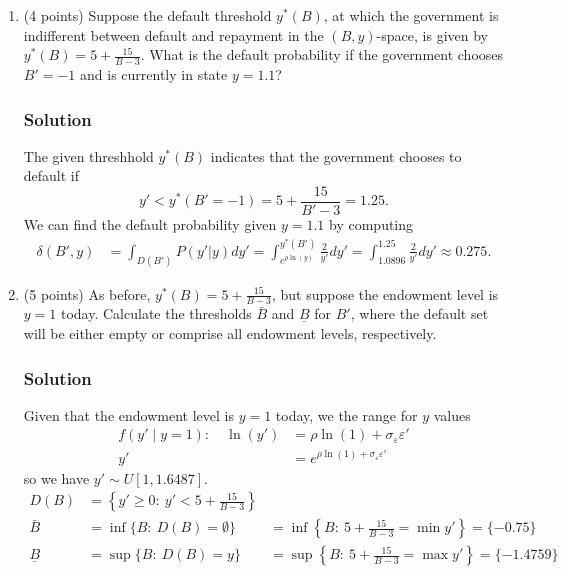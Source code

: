 \documentclass[12pt]{article}
\begin{document}
\begin{enumerate}
\begin{enumerate}
        \item (4 points) Suppose the default threshold $y^*(B)$, at which the government is indifferent between default and repayment in the $(B, y)$-space, is given by $y^*(B) = 5 + \frac{15}{B - 3}$. What is the default probability if the government chooses $B' = -1$ and is currently in state $y = 1.1$?
        \subsubsection*{Solution}

        The given threshhold $y^*(B)$ indicates that the government chooses to default if 
        \[ y' < y^*(B' = -1) = 5 + \frac{15}{B' - 3}= 1.25.\]
        We can find  the default probability given  $y = 1.1$ by computing 
        \begin{align*}
            \delta(B',y) &= \int_{D(B')} P(y'|y)dy'
            = \int^{y^*(B')}_{e^{\rho\ln(y)}} \frac{2}{y'}dy'
            = \int^{1.25}_{1.0896} \frac{2}{y'}dy'
            \approx 0.275.
        \end{align*}

        \item (5 points) As before, $y^*(B) = 5 + \frac{15}{B - 3}$, but suppose the endowment level is $y = 1$ today. Calculate the thresholds $\bar{B}$ and $\underline{B}$ for $B'$, where the default set will be either empty or comprise all endowment levels, respectively.
        \subsubsection*{Solution}

        Given that  the endowment level is $y = 1$ today, we the range for $y$ values 
        \begin{align*}
            f(y' \mid y = 1): \quad  \ln(y') &= \rho \ln(1) + \sigma_\varepsilon \varepsilon'
            \\ y'&= e^{\rho \ln(1) + \sigma_\varepsilon \varepsilon'}
        \end{align*}
        so we have $y' \sim U[1,1.6487]$.
        \begin{align*}
        D(B) &= \left\{ y' \geq 0 : \ y' < 5 + \frac{15}{B - 3} \right\}
           \\  \bar{B} &= \inf \{ B: \  D(B)=\emptyset\} 
           &= \inf\left\{ B: \ 5+\frac{15}{B-3} = \min y' \right\}
           = \{ -0.75\} 
\\            \underline{B} &= \sup \{ B: \  D(B)=y\} 
             &=  \sup\left\{ B: \ 5+\frac{15}{B-3} = \max y'  \right\} = \{ -1.4759\} 
        \end{align*}


\end{enumerate}
\end{enumerate}
\end{document}

